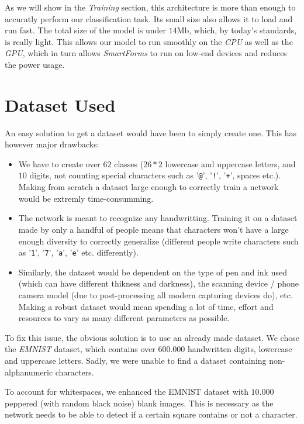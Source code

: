 \documentclass[11pt, a4paper]{report}
\def\code#1{\texttt{#1}}
\begin{document}
As we will show in the \textit{Training} section, this architecture is more than enough to accuratly perform our classification task. Its small size also allows it to load and run fast. The total size of the model is under $14$Mb, which, by today's standards, is really light. This allows our model to run smoothly on the \textit{CPU} as well as the \textit{GPU}, which in turn allows \textit{SmartForms} to run on low-end devices and reduces the power usage. 

\section{Dataset Used}

An easy solution to get a dataset would have been to simply create one. This has however major drawbacks:
\begin{itemize}
	\item We have to create over $62$ classes ($26*2$ lowercase and uppercase letters, and $10$ digits, not counting special characters such as '\code{@}', '\code{!}', '\code{+}', spaces etc.). Making from scratch a dataset large enough to correctly train a network would be extremly time-consumming.
	\item The network is meant to recognize any handwritting. Training it on a dataset made by only a handful of people means that characters won't have a large enough diversity to correctly generalize (different people write characters such as '\code{1}', '\code{7}', '\code{a}', '\code{e}' etc. differently).
	\item Similarly, the dataset would be dependent on the type of pen and ink used (which can have different thikness and darkness), the scanning device / phone camera model (due to post-processing all modern capturing devices do), etc. Making a robust dataset would mean spending a lot of time, effort and resources to vary as many different parameters as possible. 
\end{itemize}

To fix this issue, the obvious solution is to use an already made dataset.
We chose the \textit{EMNIST} \cite{emnist} dataset, which contains over $600.000$ handwritten digits, lowercase and uppercase letters. Sadly, we were unable to find a dataset containing non-alphanumeric characters.

To account for whitespaces, we enhanced the EMNIST dataset with $10.000$ peppered (with random black noise) blank images. This is necessary as the network needs to be able to detect if a certain square contains or not a character.
\end{document}
